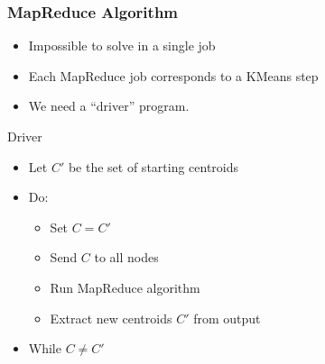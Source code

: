 \begin{frame}
\begin{center}
    \end{center}
\end{frame}

\begin{frame}
\frametitle{MapReduce Algorithm}
\begin{itemize}
\item Impossible to solve in a single job
\item Each MapReduce job corresponds to a KMeans step
\item We need a ``driver'' program.
\end{itemize}
\begin{block}{Driver}
\begin{itemize}
  \item Let $C'$ be the set of starting centroids
  \item Do: 
  \begin{itemize}
      \item Set $C = C'$
      \item Send $C$ to all nodes
      \item Run MapReduce algorithm
      \item Extract new centroids $C'$ from output 
  \end{itemize}
  \item While $C \neq C'$
\end{itemize}
\end{block}
\end{frame}

